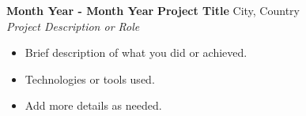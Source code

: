 \documentclass[a4paper,10pt]{article}
\begin{document}
\vspace{5pt}

\textbf{Month Year - Month Year} \hfill \textbf{Project Title} \hfill City, Country\\
\textit{Project Description or Role}
\begin{itemize}
    \item Brief description of what you did or achieved.
    \item Technologies or tools used.
    \item Add more details as needed.
\end{itemize}

\vspace{5pt}


\end{document}

